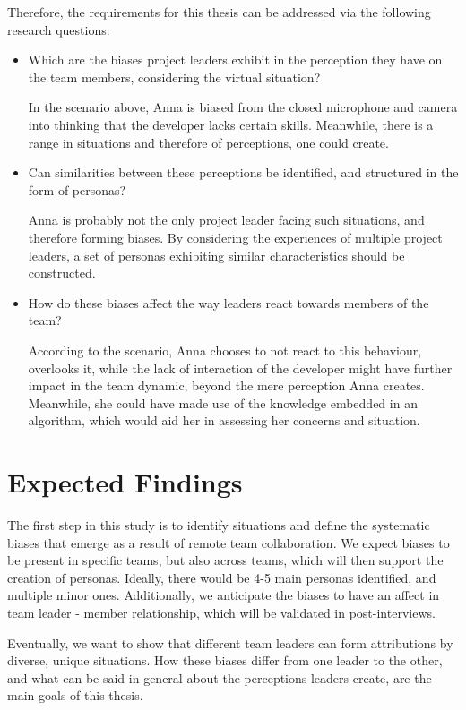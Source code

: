 \documentclass[a4paper]{article}
\begin{document}
Therefore,  the requirements for this thesis can be addressed via the following research questions:
\begin{itemize}
	\item Which are the biases project leaders exhibit in the perception they have on the team members, considering the virtual situation?

In the scenario above, Anna is biased from the closed microphone and camera into thinking that the developer lacks certain skills. Meanwhile, there is a range in situations and therefore of perceptions, one could create.

	\item Can similarities between these perceptions be identified, and structured in the form of personas?
	
Anna is probably not the only project leader facing such situations, and therefore forming biases. By considering the experiences of multiple project leaders, a set of personas exhibiting similar  characteristics should be constructed.

	\item How do these biases affect the way leaders react towards members of the team?
	
According to the scenario, Anna chooses to not react to this behaviour, overlooks it, while the lack of interaction of the developer might have further impact in the team dynamic, beyond the mere perception Anna creates. Meanwhile, she could have made use of the knowledge embedded in an algorithm, which would aid her in assessing her concerns and situation.
\end{itemize}

\section{Expected Findings}

The first step in this study is to identify situations and define the systematic biases that emerge as a result of remote team collaboration. We expect biases to be present in specific teams, but also across teams, which will then support the creation of personas. Ideally, there would be 4-5 main personas identified, and multiple minor ones. Additionally, we anticipate the biases to have an affect in team leader - member relationship, which will be validated in post-interviews.

Eventually, we want to show that different team leaders can form attributions by diverse, unique situations. How these biases differ from one leader to the other, and what can be said in general about the perceptions leaders create, are the main goals of this thesis.
\end{document}
